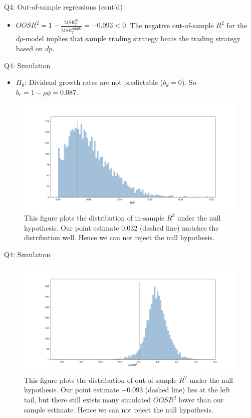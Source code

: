 \documentclass[10pt,t]{beamer}
\begin{document}
\begin{frame}{Q4: Out-of-sample regressions (cont'd)}
\begin{itemize}
  \item $OOSR^2 = 1 - \frac{\text{MSE}^{dp}_T}{\text{MSE}^{\text{simple}}_T} = -0.093 < 0$. The negative out-of-sample $R^2$ for the $dp$-model implies that sample trading strategy beats the trading strategy based on $dp$.
\end{itemize}
\end{frame}

\begin{frame}{Q4: Simulation}
\begin{itemize}
  \item $H_0$: Dividend growth rates are not predictable ($b_d = 0$). So $b_r = 1 - \rho \phi = 0.087$.
\end{itemize}
\begin{figure}[h!]
\centering
\includegraphics[width=\linewidth]{q4fig2.pdf}
\caption{This figure plots the distribution of in-sample $R^2$ under the null hypothesis. Our point estimate $0.032$ (dashed line) matches the distribution well. Hence we can not reject the null hypothesis.}
\end{figure}
\end{frame}

\begin{frame}{Q4: Simulation}
\begin{figure}[h!]
\centering
\includegraphics[width=\linewidth]{q4fig3.pdf}
\caption{This figure plots the distribution of out-of-sample $R^2$ under the null hypothesis. Our point estimate $-0.093$ (dashed line) lies at the left tail, but there still exists many simulated $OOSR^2$ lower than our sample estimate. Hence we can not reject the null hypothesis.}
\end{figure}
\end{frame}
\end{document}
